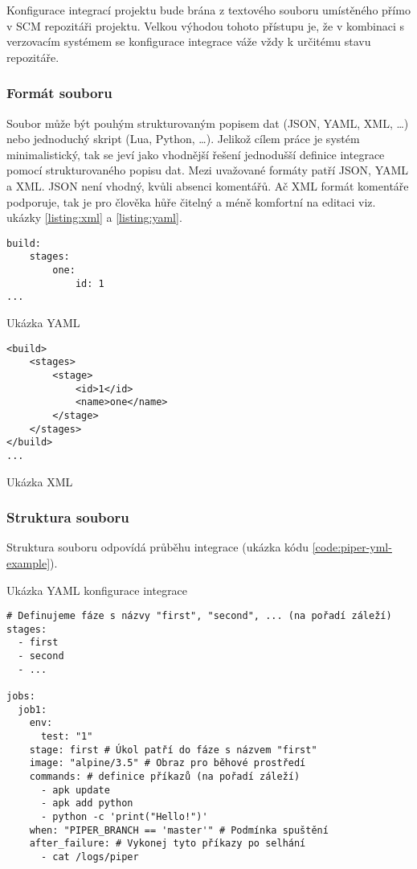 Konfigurace integrací projektu bude brána z textového souboru umístěného přímo v SCM repozitáři projektu.
Velkou výhodou tohoto přístupu je, že v kombinaci s verzovacím systémem se konfigurace integrace váže vždy k určitému stavu repozitáře.

\subsubsection{Formát souboru}

Soubor může být pouhým strukturovaným popisem dat (JSON, YAML, XML, \ldots) nebo jednoduchý skript (Lua, Python, \ldots).
Jelikož cílem práce je systém minimalistický, tak se jeví jako vhodnější řešení jednodušší definice integrace pomocí strukturovaného popisu dat.
Mezi uvažované formáty patří JSON, YAML a XML.
JSON není vhodný, kvůli absenci komentářů.
Ač XML formát komentáře podporuje, tak je pro člověka hůře čitelný a méně komfortní na editaci viz. ukázky \ref{listing:xml} a \ref{listing:yaml}.

\begin{listing}[ht]
\begin{verbatim}
build:
    stages:
        one:
            id: 1
...
\end{verbatim}
\caption{Ukázka YAML}
\label{listing:yaml}
\end{listing}

\begin{listing}[ht]
\begin{verbatim}
<build>
    <stages>
        <stage>
            <id>1</id>
            <name>one</name>
        </stage>
    </stages>
</build>
...
\end{verbatim}
\caption{Ukázka XML}
\label{listing:xml}
\end{listing}

\subsubsection{Struktura souboru}

Struktura souboru odpovídá průběhu integrace (ukázka kódu \ref{code:piper-yml-example}).

\begin{listing}[ht]
\caption{\label{code:piper-yml-example}Ukázka YAML konfigurace integrace}
\begin{verbatim}
# Definujeme fáze s názvy "first", "second", ... (na pořadí záleží)
stages:
  - first
  - second
  - ...

jobs:
  job1:
    env:
      test: "1"
    stage: first # Úkol patří do fáze s názvem "first"
    image: "alpine/3.5" # Obraz pro běhové prostředí
    commands: # definice příkazů (na pořadí záleží)
      - apk update
      - apk add python
      - python -c 'print("Hello!")'
    when: "PIPER_BRANCH == 'master'" # Podmínka spuštění
    after_failure: # Vykonej tyto příkazy po selhání
      - cat /logs/piper
\end{verbatim}
\end{listing}

